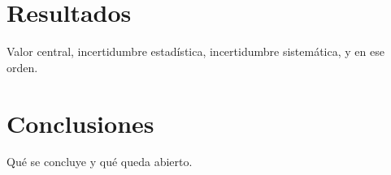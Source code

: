 \documentclass[12pt, a4paper]{article}
\begin{document}
\section{Resultados}

Valor central, incertidumbre estadística, incertidumbre sistemática, y en ese
orden.

\section{Conclusiones}

Qué se concluye y qué queda abierto.

\printbibliography
\end{document}
